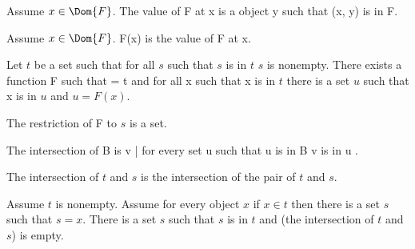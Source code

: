 \documentclass{article}
\begin{document}
\begin{forthel}
    \begin{axiom}
      Assume $x \in \Dom{F}$.
      The value of F at x is a object y such that (x, y) is in F.
    \end{axiom}

    \begin{definition}
      Assume $x \in \Dom{F}$.
      F(x) is the value of F at x.
    \end{definition}

    \begin{axiom}[Choice]
      Let $t$ be a set such that for all $s$ such that $s$ is in $t$ $s$ is nonempty.
      There exists a function F such that  = t
      and for all x such that x is in $t$ there is a set $u$ such that x is in $u$ and $u = F(x)$.
    \end{axiom}

    \begin{axiom}[Replacement]
      The restriction of F to $s$ is a set.
    \end{axiom}

    \begin{definition}
      The intersection of B is { v | for every set u such that u is in B v is in u }.
    \end{definition}

    \begin{definition}
      The intersection of $t$ and $s$ is the intersection of the pair of $t$ and $s$.
    \end{definition}

    \begin{axiom}[Foundation]
      Assume $t$ is nonempty.
      Assume for every object $x$ if $x \in t$
        then there is a set $s$ such that $s = x$.
      There is a set $s$ such that $s$ is in $t$ and
         (the intersection of $t$ and $s$) is empty.
    \end{axiom}
  \end{forthel}
\end{document}
